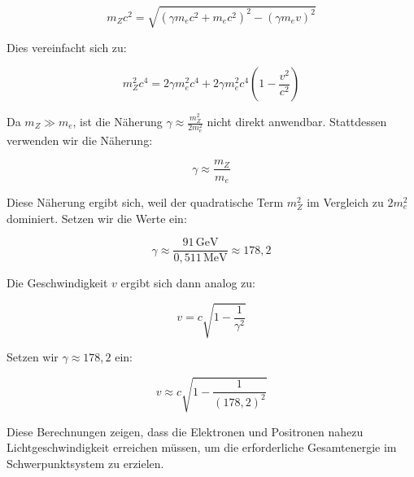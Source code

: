 \[
m_Z c^2 = \sqrt{(\gamma m_e c^2 + m_e c^2)^2 - (\gamma m_e v)^2}
\]

Dies vereinfacht sich zu:

\[
m_Z^2 c^4 = 2 \gamma m_e^2 c^4 + 2 \gamma m_e^2 c^4 \left(1 - \frac{v^2}{c^2}\right)
\]

Da \( m_Z \gg m_e \), ist die Näherung \( \gamma \approx \frac{m_Z^2}{2 m_e^2} \) nicht direkt anwendbar. Stattdessen verwenden wir die Näherung:

\[
\gamma \approx \frac{m_Z}{m_e}
\]

Diese Näherung ergibt sich, weil der quadratische Term \( m_Z^2 \) im Vergleich zu \( 2 m_e^2 \) dominiert. Setzen wir die Werte ein:

\[
\gamma \approx \frac{91 \, \text{GeV}}{0{,}511 \, \text{MeV}} \approx 178{,}2
\]

Die Geschwindigkeit \( v \) ergibt sich dann analog zu:

\[
v = c \sqrt{1 - \frac{1}{\gamma^2}}
\]

Setzen wir \( \gamma \approx 178{,}2 \) ein:

\[
v \approx c \sqrt{1 - \frac{1}{(178{,}2)^2}}
\]

Diese Berechnungen zeigen, dass die Elektronen und Positronen nahezu Lichtgeschwindigkeit erreichen müssen, um die erforderliche Gesamtenergie im Schwerpunktsystem zu erzielen.
